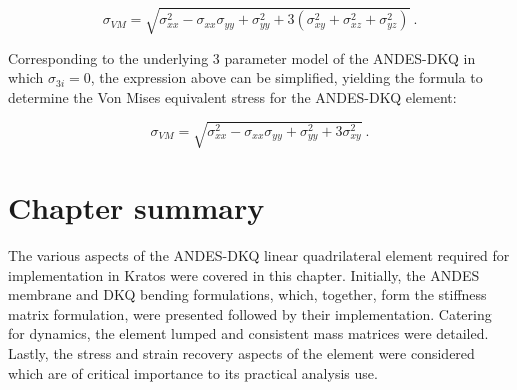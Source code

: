 \begin{equation} 
\sigma_{VM} = 
\sqrt{
	\sigma_{xx}^2
	- \sigma_{xx}\sigma_{yy}
	+ \sigma_{yy}^2
	+ 3(\sigma_{xy}^2 + \sigma_{xz}^2 + \sigma_{yz}^2)
}
\label{eqqrec5}\ .
\end{equation}

Corresponding to the underlying 3 parameter model of the ANDES-DKQ in which $\sigma_{3i} = 0$, the expression above can be simplified, yielding the formula to determine the Von Mises equivalent stress for the ANDES-DKQ element:

\begin{equation} 
\sigma_{VM} = 
\sqrt{
	\sigma_{xx}^2
	- \sigma_{xx}\sigma_{yy}
	+ \sigma_{yy}^2
	+ 3\sigma_{xy}^2
}
\label{eqqrec6}\ .
\end{equation}

\section{Chapter summary}
The various aspects of the ANDES-DKQ linear quadrilateral element required for implementation in Kratos were covered in this chapter. Initially, the ANDES membrane and DKQ bending formulations, which, together, form the stiffness matrix formulation, were presented followed by their implementation. Catering for dynamics, the element lumped and consistent mass matrices were detailed. Lastly, the stress and strain recovery aspects of the element were considered which are of critical importance to its practical analysis use.